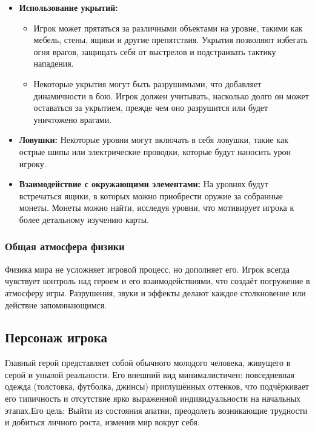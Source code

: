 \documentclass[12pt]{article}
\begin{document}
            \begin{itemize}
                \item \textbf{Использование укрытий:} 
                \begin{itemize}
                    \item Игрок может прятаться за различными объектами на уровне, такими как мебель, стены, ящики и другие препятствия. Укрытия позволяют избегать огня врагов, защищать себя от выстрелов и подстраивать тактику нападения.
                    \item Некоторые укрытия могут быть разрушимыми, что добавляет динамичности в бою. Игрок должен учитывать, насколько долго он может оставаться за укрытием, прежде чем оно разрушится или будет уничтожено врагами.
                \end{itemize}
                
                \item \textbf{Ловушки:} 
                    Некоторые уровни могут включать в себя ловушки, такие как острые шипы или электрические проводки, которые будут наносить урон игроку.
                \item \textbf{Взаимодействие с окружающими элементами:}
                        На уровнях будут встречаться ящики, в которых можно приобрести оружие за собранные монеты. Монеты можно найти, исследуя уровни, что мотивирует игрока к более детальному изучению карты.
            \end{itemize}

        
        \subsubsection{Общая атмосфера физики}
        
        Физика мира не усложняет игровой процесс, но дополняет его. Игрок всегда чувствует контроль над героем и его взаимодействиями, что создаёт погружение в атмосферу игры. Разрушения, звуки и эффекты делают каждое столкновение или действие запоминающимся.

    \subsection{Персонаж игрока}
        Главный герой представляет собой обычного молодого человека, живущего в серой и унылой реальности. Его внешний вид минималистичен: повседневная одежда (толстовка, футболка, джинсы) приглушённых оттенков, что подчёркивает его типичность и отсутствие ярко выраженной индивидуальности на начальных этапах.Его цель: Выйти из состояния апатии, преодолеть возникающие трудности и добиться личного роста, изменив мир вокруг себя.
\end{document}
